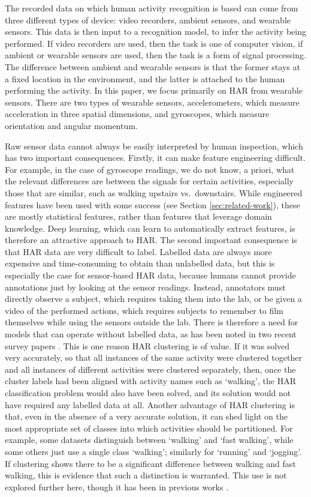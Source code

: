 \documentclass[wcp]{jmlr}
\begin{document}
The recorded data on which human activity recognition is based can come from three different types of device: video recorders, ambient sensors, and wearable sensors. 
This data is then input to a recognition model, to infer the activity being performed. If video recorders are used, then the task is one of computer vision, if ambient or wearable sensors are used, then the task is a form of signal processing. The difference between ambient and wearable sensors is that the former stays at a fixed location in the environment, and the latter is attached to the human performing the activity. In this paper, we focus primarily on HAR from wearable sensors. There are two types of wearable sensors, accelerometers, which measure acceleration in three spatial dimensions, and gyroscopes, which measure orientation and angular momentum. 

Raw sensor data cannot always be easily interpreted by human inspection, which has two important consequences. Firstly, it can make feature engineering difficult. For example, in the case of gyroscope readings, we do not know, a priori, what the relevant differences are between the signals for certain activities, especially those that are similar, such as walking upstairs vs.\ downstairs. While engineered features have been used with some success (see Section \ref{sec:related-work}), these are mostly statistical features, rather than features that leverage domain knowledge. Deep learning, which can learn to automatically extract features, is therefore an attractive approach to HAR. The second important consequence is that HAR data are very difficult to label. Labelled data are always more expensive and time-consuming to obtain than unlabelled data, but this is especially the case for sensor-based HAR data, because humans cannot provide annotations just by looking at the sensor readings. Instead, annotators must directly observe a subject, which requires taking them into the lab, or be given a video of the performed actions, which requires subjects to remember to film themselves while using the sensors outside the lab. There is therefore a need for models that can operate without labelled data, as has been noted in two recent survey papers \citep{wang2019deep,chen2021deep}. This is one reason HAR clustering is of value. If it was solved very accurately, so that all instances of the same activity were clustered together and all instances of different activities were clustered separately, then, once the cluster labels had been aligned with activity names such as `walking', the HAR classification problem would also have been solved, and its solution would not have required any labelled data at all. Another advantage of HAR clustering is that, even in the absence of a very accurate solution, it can shed light on the most appropriate set of classes into which activities should be partitioned. 
For example, some datasets distinguish between `walking' and `fast walking', while some others just use a single class `walking'; similarly for `running' and `jogging'. If clustering shows there to be a significant difference between walking and fast walking, this is evidence that such a distinction is warranted. This use is not explored further here, though it has been in previous works \citep{mejia2017evaluate}.
\end{document}
